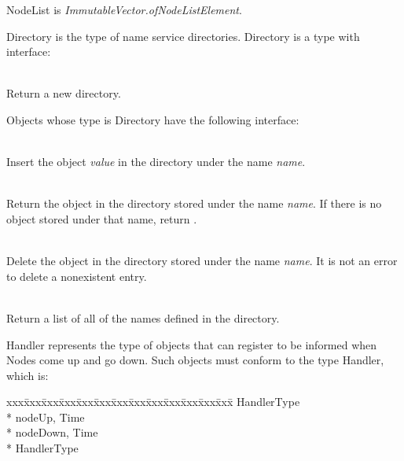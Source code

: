 \noindent NodeList is
{\it ImmutableVector.of\/\LB{}NodeListElement\/\RB{}}.

Directory is the type of name service directories.  Directory is a type with
interface:
\begin{desc}
  \item[\kw{operation} create \returns{} \/\LB{}r \CO{} Directory\/\RB{}]~\\
    Return a new directory.
\end{desc}

\noindent Objects whose type is Directory have the following
interface:

\begin{desc}
  \item[\kw{operation} insert\/\LB{}name \CO{} \tn{String}, value \CO{} \tn{Any}\/\RB{}]~\\
    Insert the object {\it value} in the directory under the name {\it name}.
  \item[\kw{function} lookup\/\LB{}name \CO{} \tn{String}\/\RB{} \returns{} \/\LB{}\tn{Any}\/\RB{}]~\\
    Return the object in the directory stored under the name {\it name}.  If
    there is no object stored under that name, return .
  \item[\kw{operation} delete\/\LB{}\tn{String}\/\RB{}]~\\
    Delete the object in the directory stored under the name {\it name}.
    It is not an error to delete a nonexistent entry.
  \item[\kw{function} list \returns{} \/\LB{}ImmutableVectorOfString\/\RB{}]~\\
    Return a list of all of the names defined in the directory.
\end{desc}

Handler represents the type of objects that can register to be informed when
Nodes come up and go down.  Such objects must conform to the type Handler,
which is:

{\it\begin{minipage}{\textwidth}\begin{tabbing}
xxx\=xxx\=xxx\=xxx\=xxx\=xxx\=xxx\=xxx\=xxx\=xxx\=xxx\=xxx\=xxx\=\+\kill%
 HandlerType\+\\*{}%
   nodeUp\/\LB{}, Time\/\RB{}\\*{}%
   nodeDown\/\LB{}, Time\/\RB{}\-\\*{}%
 HandlerType
\end{tabbing}\end{minipage}}

